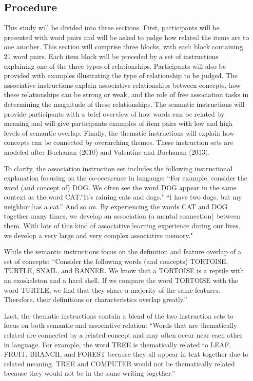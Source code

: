 \documentclass[english,man]{apa6}
\theoremstyle{definition}
\theoremstyle{definition}
\theoremstyle{definition}
\theoremstyle{remark}
\begin{document}
\subsection{Procedure}\label{procedure}

This study will be divided into three sections. First, participants will
be presented with word pairs and will be asked to judge how related the
items are to one another. This section will comprise three blocks, with
each block containing 21 word pairs. Each item block will be preceded by
a set of instructions explaining one of the three types of
relationships. Participants will also be provided with examples
illustrating the type of relationship to be judged. The associative
instructions explain associative relationships between concepts, how
these relationships can be strong or weak, and the role of free
association tasks in determining the magnitude of these relationships.
The semantic instructions will provide participants with a brief
overview of how words can be related by meaning and will give
participants examples of item pairs with low and high levels of semantic
overlap. Finally, the thematic instructions will explain how concepts
can be connected by overarching themes. These instruction sets are
modeled after Buchanan (2010) and Valentine and Buchanan (2013).

To clarify, the association instruction set includes the following
instructional explanation focusing on the co-occurence in langauge:
\enquote{For example, consider the word (and concept of) DOG. We often
see the word DOG appear in the same context as the word CAT.}It's
raining cats and dogs." \enquote{I have two dogs, but my neighbor has a
cat.} And so on. By experiencing the words CAT and DOG together many
times, we develop an association (a mental connection) between them.
With lots of this kind of associative learning experience during our
lives, we develop a very large and very complex associative memory."

While the semantic instructions focus on the definition and feature
overlap of a set of concepts: \enquote{Consider the following words (and
concepts) TORTOISE, TURTLE, SNAIL, and BANNER. We know that a TORTOISE
is a reptile with an exoskeleton and a hard shell. If we compare the
word TORTOISE with the word TURTLE, we find that they share a majority
of the same features. Therefore, their definitions or characteristics
overlap greatly.}

Last, the thematic instructions contain a blend of the two instruction
sets to focus on both semantic and associative relation: \enquote{Words
that are thematically related are connected by a related concept and may
often occur near each other in language. For example, the word TREE is
thematically related to LEAF, FRUIT, BRANCH, and FOREST because they all
appear in text together due to related meaning. TREE and COMPUTER would
not be thematically related because they would not be in the same
writing together.}
\end{document}
